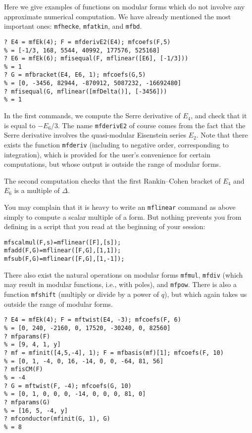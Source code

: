 \documentclass[11pt]{article}
\def\kbd#1{{\tt #1}}
\begin{document}
Here we give examples of functions on modular forms which do not involve
any approximate numerical computation. We have already mentioned the most
important ones: \kbd{mfhecke}, \kbd{mfatkin}, and \kbd{mfbd}.

\begin{verbatim}
? E4 = mfEk(4); F = mfderivE2(E4); mfcoefs(F,5)
% = [-1/3, 168, 5544, 40992, 177576, 525168]
? E6 = mfEk(6); mfisequal(F, mflinear([E6], [-1/3]))
% = 1
? G = mfbracket(E4, E6, 1); mfcoefs(G,5)
% = [0, -3456, 82944, -870912, 5087232, -16692480]
? mfisequal(G, mflinear([mfDelta()], [-3456]))
% = 1
\end{verbatim}

\medskip

In the first commands, we compute the Serre derivative of $E_4$, and
check that it is equal to $-E_6/3$. The name \kbd{mfderivE2} of course
comes from the fact that the Serre derivative involves the quasi-modular
Eisenstein series $E_2$. Note that there exists the function \kbd{mfderiv}
(including to negative order, corresponding to integration), which is
provided for the user's convenience for certain computations, but whose
output is outside the range of modular forms.

The second computation checks that the first Rankin--Cohen bracket of
$E_4$ and $E_6$ is a multiple of $\Delta$.

You may complain that it is heavy to write an \kbd{mflinear} command as above
simply to compute a scalar multiple of a form. But nothing prevents you from
defining in a script that you read at the beginning of your session:

\begin{verbatim}
mfscalmul(F,s)=mflinear([F],[s]);
mfadd(F,G)=mflinear([F,G],[1,1]);
mfsub(F,G)=mflinear([F,G],[1,-1]);
\end{verbatim}

There also exist the natural operations on modular forms \kbd{mfmul},
\kbd{mfdiv} (which may result in modular functions, i.e., with poles),
and \kbd{mfpow}. There is also a function \kbd{mfshift} (multiply or divide
by a power of $q$), but which again takes us outside the range of modular
forms.

\begin{verbatim}
? E4 = mfEk(4); F = mftwist(E4, -3); mfcoefs(F, 6)
% = [0, 240, -2160, 0, 17520, -30240, 0, 82560]
? mfparams(F)
% = [9, 4, 1, y]
? mf = mfinit([4,5,-4], 1); F = mfbasis(mf)[1]; mfcoefs(F, 10)
% = [0, 1, -4, 0, 16, -14, 0, 0, -64, 81, 56]
? mfisCM(F)
% = -4
? G = mftwist(F, -4); mfcoefs(G, 10)
% = [0, 1, 0, 0, 0, -14, 0, 0, 0, 81, 0]
? mfparams(G)
% = [16, 5, -4, y]
? mfconductor(mfinit(G, 1), G)
% = 8
\end{verbatim}
\end{document}
